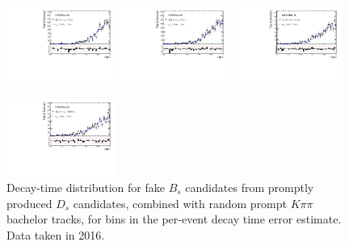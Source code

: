 \begin{figure}[h]
\includegraphics[height=!,width=0.32\textwidth]{figs/Resolution/SignalData_16_bin_7.pdf}
\includegraphics[height=!,width=0.32\textwidth]{figs/Resolution/SignalData_16_bin_8.pdf}
\includegraphics[height=!,width=0.32\textwidth]{figs/Resolution/SignalData_16_bin_9.pdf}

\includegraphics[height=!,width=0.32\textwidth]{figs/Resolution/SignalData_16_bin_10.pdf}
\caption{Decay-time distribution for fake $B_s$ candidates from promptly produced $D_s$ candidates, combined with random prompt $K\pi\pi$ bachelor tracks, for bins in the per-event decay time error estimate. Data taken in 2016.}
\label{fig:}
\end{figure}


